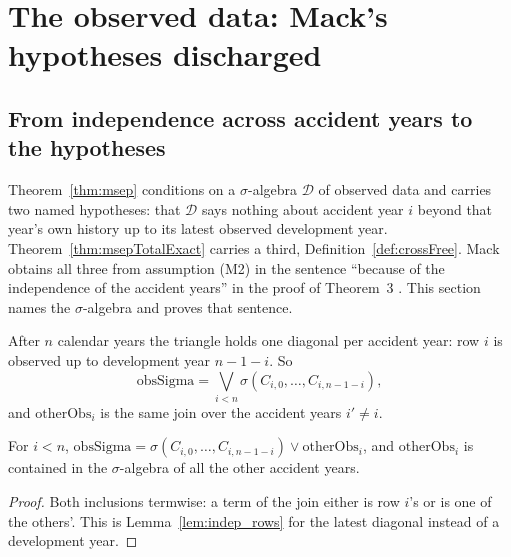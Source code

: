 
\chapter{The observed data: Mack's hypotheses discharged}

\section{From independence across accident years to the hypotheses}

Theorem~\ref{thm:msep} conditions on a $\sigma$-algebra $\mathcal{D}$ of observed data and carries
two named hypotheses: that $\mathcal{D}$ says nothing about accident year $i$ beyond that year's own
history up to its latest observed development year. Theorem~\ref{thm:msepTotalExact} carries a
third, Definition~\ref{def:crossFree}. Mack obtains all three from assumption (M2) in the sentence
``because of the independence of the accident years'' in the proof of Theorem~3
\cite[pp.~217--219]{Mack1993}. This section names the $\sigma$-algebra and proves that sentence.

\begin{definition}\label{def:obsSigma}\leanok
{}
After $n$ calendar years the triangle holds one diagonal per accident year: row $i$ is observed up
to development year $n-1-i$. So
\[
  \mathrm{obsSigma} = \bigvee_{i < n} \sigma(C_{i,0},\dots,C_{i,n-1-i}),
\]
and $\mathrm{otherObs}_i$ is the same join over the accident years $i' \ne i$.
\end{definition}

\begin{lemma}\label{lem:obsSplit}\leanok
{}
For $i < n$, $\mathrm{obsSigma} = \sigma(C_{i,0},\dots,C_{i,n-1-i}) \vee \mathrm{otherObs}_i$, and
$\mathrm{otherObs}_i$ is contained in the $\sigma$-algebra of all the other accident years.
\end{lemma}
\begin{proof}\leanok
Both inclusions termwise: a term of the join either is row $i$'s or is one of the others'. This is
Lemma~\ref{lem:indep_rows} for the latest diagonal instead of a development year.
\end{proof}

